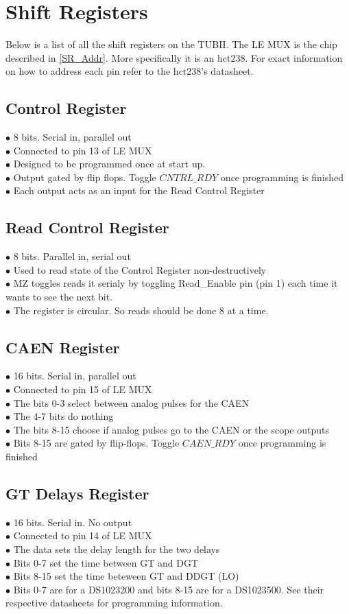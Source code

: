 \documentclass[11pt,a4paper]{article}
\begin{document}
\section{Shift Registers}
Below is a list of all the shift registers on the TUBII. The LE MUX is the chip described in \ref{SR_Addr}. More specifically it is an hct238.  For exact information on how to address each pin refer to the hct238's datasheet.
\subsection{Control Register}
$\bullet$ 8 bits. Serial in, parallel out\\
$\bullet$ Connected to pin 13 of LE MUX\\
$\bullet$ Designed to be programmed once at start up.\\
$\bullet$ Output gated by flip flops. Toggle $CNTRL\_RDY$ once programming is finished\\
$\bullet$ Each output acts as an input for the Read Control Register\\
\subsection{Read Control Register}
$\bullet$ 8 bits. Parallel in, serial out \\
$\bullet$ Used to read state of the Control Register non-destructively \\
$\bullet$ MZ toggles reads it serialy by toggling Read\_Enable pin (pin 1) each time it wants to see the next bit.\\
$\bullet$ The register is circular. So reads should be done 8 at a time.\\
\subsection{CAEN Register}
$\bullet$ 16 bits. Serial in, parallel out\\
$\bullet$ Connected to pin 15 of LE MUX \\
$\bullet$ The bits 0-3 select between analog pulses for the CAEN\\
$\bullet$ The 4-7 bits do nothing\\
$\bullet$ The bits 8-15 choose if analog pulses go to the CAEN or the scope outputs\\
$\bullet$ Bits 8-15 are gated by flip-flops. Toggle $CAEN\_RDY$ once programming is finished\\
\subsection{GT Delays Register}
$\bullet$ 16 bits. Serial in. No output\\
$\bullet$ Connected to pin 14 of LE MUX\\
$\bullet$ The data sets the delay length for the two delays\\
$\bullet$ Bits 0-7 set the time between GT and DGT\\
$\bullet$ Bits 8-15 set the time beteween GT and DDGT (LO)\\
$\bullet$ Bits 0-7 are for a DS1023200 and bits 8-15 are for a DS1023500. See their respective datasheets for programming information.\\
\end{document}
